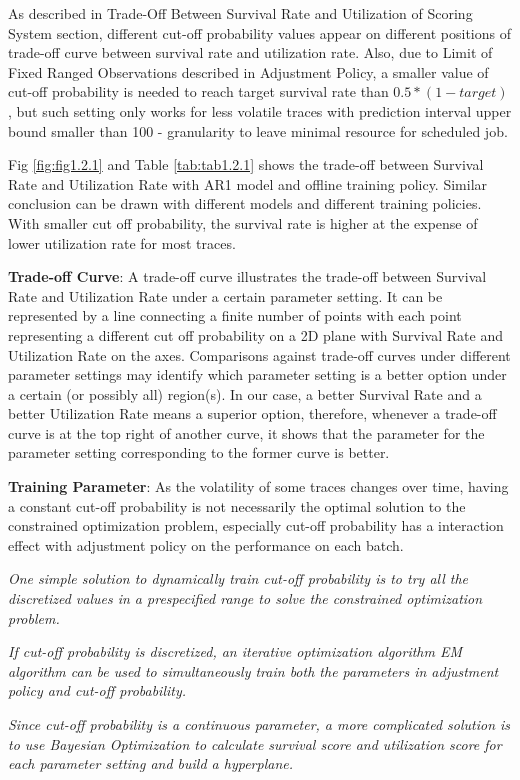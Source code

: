 \documentclass{article}
\begin{document}
\begin{flushleft}
As described in Trade-Off Between Survival Rate and Utilization of Scoring
System section, different cut-off probability values appear on different
positions of trade-off curve between survival rate and utilization rate. Also,
due to Limit of Fixed Ranged Observations described in Adjustment Policy, a
smaller value of cut-off probability is needed to reach target survival rate
than $0.5 * (1 - target)$, but such setting only works for less volatile traces
with prediction interval upper bound smaller than 100 - granularity to leave
minimal resource for scheduled job.
\end{flushleft}

\begin{flushleft}
Fig \ref{fig:fig1.2.1} and Table \ref{tab:tab1.2.1} shows the trade-off between
Survival Rate and Utilization Rate with AR1 model and offline training policy.
Similar conclusion can be drawn with different models and different training
policies. With smaller cut off probability, the survival rate is higher at the
expense of lower utilization rate for most traces.
\end{flushleft}

\begin{flushleft}
\textbf{Trade-off Curve}: A trade-off curve illustrates the trade-off between
Survival Rate and Utilization Rate under a certain parameter setting. It can be
represented by a line connecting a finite number of points with each point
representing a different cut off probability on a 2D plane with Survival Rate
and Utilization Rate on the axes. Comparisons against trade-off curves under
different parameter settings may identify which parameter setting is a better
option under a certain (or possibly all) region(s). In our case, a better
Survival Rate and a better Utilization Rate means a superior option, therefore,
whenever a trade-off curve is at the top right of another curve, it shows that
the parameter for the parameter setting corresponding to the former curve is
better. 
\end{flushleft}

\begin{flushleft}
\textbf{Training Parameter}: As the volatility of some traces changes over time,
having a constant cut-off probability is not necessarily the optimal solution to
the constrained optimization problem, especially cut-off probability has a
interaction effect with adjustment policy on the performance on each batch.

\textit{One simple solution to dynamically train cut-off probability is to try all the discretized values in a prespecified range to solve the constrained optimization problem.}

\textit{If cut-off probability is discretized, an iterative optimization algorithm EM algorithm can be used to simultaneously train both the parameters in adjustment policy and cut-off probability. }

\textit{Since cut-off probability is a continuous parameter, a more complicated solution is to use Bayesian Optimization to calculate survival score and utilization score for each parameter setting and build a hyperplane.}
\end{flushleft}
\end{document}
